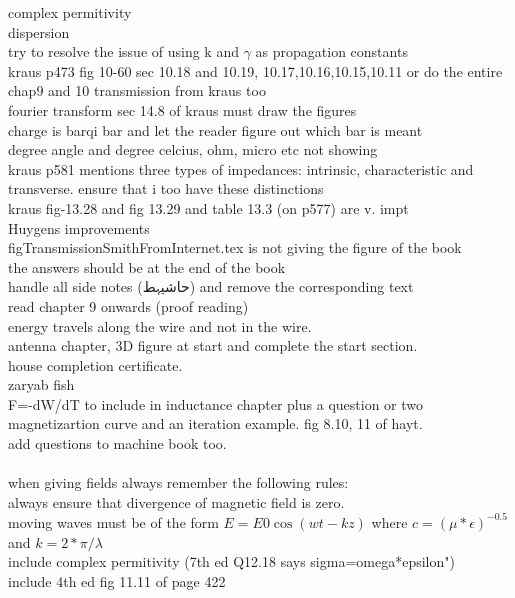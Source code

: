 \begin{otherlanguage}{english}
complex permitivity\\
dispersion\\
try to resolve the issue of using k and $\gamma$ as propagation constants\\
kraus p473 fig 10-60 sec 10.18 and 10.19, 10.17,10.16,10.15,10.11 or do the entire chap9 and 10  transmission from kraus too\\
fourier transform sec 14.8 of kraus must draw the figures\\
charge is barqi bar and let the reader figure out which bar is meant\\
degree angle and degree celcius, ohm, micro etc not showing\\
kraus p581 mentions three types of impedances: intrinsic, characteristic and transverse. ensure that i too have these distinctions\\
kraus fig-13.28 and fig 13.29 and table 13.3 (on p577) are v. impt\\
Huygens improvements\\
figTransmissionSmithFromInternet.tex is not giving the figure of the book\\
the answers should be at the end of the book\\
handle all side notes (حاشیہط) and remove the corresponding text\\
read chapter 9 onwards (proof reading)\\
energy travels along the wire and not in the wire.\\
antenna chapter, 3D figure at start and complete the start section.\\
house completion certificate.\\
zaryab fish\\
F=-dW/dT to include in inductance chapter plus a question or two\\
magnetizartion curve and an iteration example. fig 8.10, 11 of hayt.\\
add questions to machine book too.\\
\\
when giving fields always remember the following rules:\\
always ensure that divergence of magnetic field is zero.\\
moving waves must be of the form $E=E0 \cos(wt-kz)$ where $c=(\mu*\epsilon)^{-0.5}$ and $k=2*\pi/\lambda$\\
include complex permitivity  (7th ed Q12.18 says sigma=omega*epsilon")\\
include 4th ed fig 11.11 of page 422
\end{otherlanguage}
